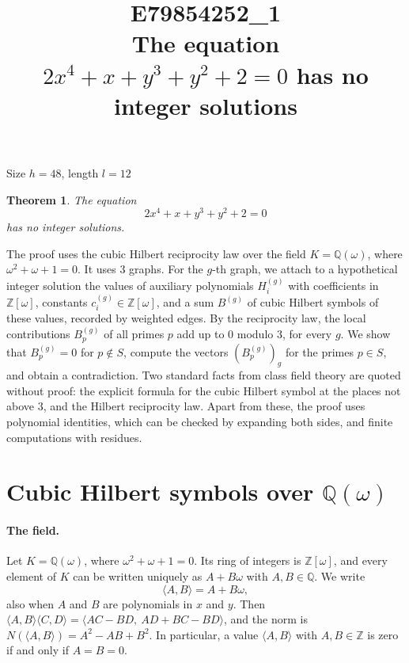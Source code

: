 \documentclass[11pt]{article}
\title{\textbf{E79854252\_1}\\[4pt] {\Large The equation $2x^{4}+x+y^{3}+y^{2}+2=0$ has no integer solutions}}
\author{}
\date{}
\newtheorem{theorem}{Theorem}
\newcommand{\Z}{\mathbb{Z}}
\newcommand{\Q}{\mathbb{Q}}
\begin{document}
\maketitle
\vspace{-8ex}
\begin{center}
Size $h=48$, length $l=12$
\end{center}

\begin{theorem}\label{thm:main}
The equation
\begin{equation}\label{eq:main}
2x^{4}+x+y^{3}+y^{2}+2=0
\end{equation}
has no integer solutions.
\end{theorem}

The proof uses the cubic Hilbert reciprocity law over the field $K=\Q(\omega)$, where $\omega^2+\omega+1=0$. It uses 3 graphs. For the $g$-th graph, we attach to a hypothetical integer solution the values of auxiliary polynomials $H^{(g)}_i$ with coefficients in $\Z[\omega]$, constants $c^{(g)}_i\in\Z[\omega]$, and a sum $B^{(g)}$ of cubic Hilbert symbols of these values, recorded by weighted edges. By the reciprocity law, the local contributions $B^{(g)}_p$ of all primes $p$ add up to $0$ modulo $3$, for every $g$. We show that $B^{(g)}_p=0$ for $p\notin S$, compute the vectors $(B^{(g)}_p)_g$ for the primes $p\in S$, and obtain a contradiction. Two standard facts from class field theory are quoted without proof: the explicit formula for the cubic Hilbert symbol at the places not above $3$, and the Hilbert reciprocity law. Apart from these, the proof uses polynomial identities, which can be checked by expanding both sides, and finite computations with residues.


\section{\texorpdfstring{Cubic Hilbert symbols over $\Q(\omega)$}{Cubic Hilbert symbols over Q(w)}}\label{sec:symbols}

\paragraph{The field.} Let $K=\Q(\omega)$, where $\omega^2+\omega+1=0$. Its ring of integers is $\Z[\omega]$, and every element of $K$ can be written uniquely as $A+B\omega$ with $A,B\in\Q$. We write
\[
\langle A,B\rangle=A+B\omega,
\]
also when $A$ and $B$ are polynomials in $x$ and $y$. Then $\langle A,B\rangle\langle C,D\rangle=\langle AC-BD,\ AD+BC-BD\rangle$, and the norm is $N(\langle A,B\rangle)=A^2-AB+B^2$. In particular, a value $\langle A,B\rangle$ with $A,B\in\Z$ is zero if and only if $A=B=0$.
\end{document}
